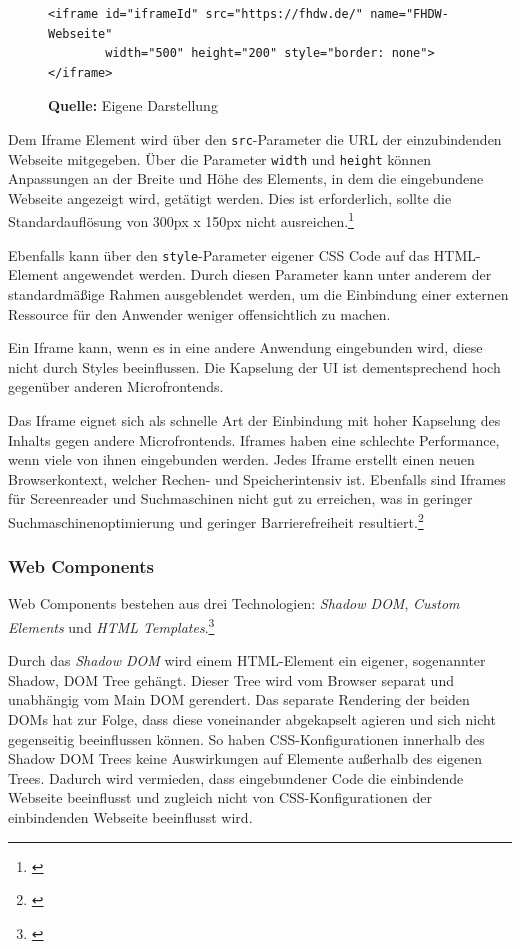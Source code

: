 \begin{figure}[bht]
	\begin{lstlisting}[caption=Exemplarische Einbindung einer Webseite über das Iframe-Element, label=list:iframe]
		<iframe id="iframeId" src="https://fhdw.de/" name="FHDW-Webseite" 
		width="500" height="200" style="border: none"></iframe>
	\end{lstlisting}
	\footnoterule{}
	\footnotesize{\textbf{Quelle:} Eigene Darstellung}
\end{figure}

Dem Iframe Element wird über den \texttt{src}-Parameter die \gls{URL} der einzubindenden Webseite mitgegeben. Über die Parameter \texttt{width} und \texttt{height} können Anpassungen an der Breite und Höhe des Elements, in dem die eingebundene Webseite angezeigt wird, getätigt werden. Dies ist erforderlich, sollte die Standardauflösung von 300px x 150px nicht ausreichen.\footnote{\cite[vgl.][]{MDNWebDocs2021a}}

Ebenfalls kann über den \texttt{style}-Parameter eigener \gls{CSS} Code auf das \gls{HTML}-Element angewendet werden. Durch diesen Parameter kann unter anderem der standardmäßige Rahmen ausgeblendet werden, um die Einbindung einer externen Ressource für den Anwender weniger offensichtlich zu machen.

Ein Iframe kann, wenn es in eine andere Anwendung eingebunden wird, diese nicht durch Styles beeinflussen. Die Kapselung der UI ist dementsprechend hoch gegenüber anderen Microfrontends.

Das Iframe eignet sich als schnelle Art der Einbindung mit hoher Kapselung des Inhalts gegen andere Microfrontends. Iframes haben eine schlechte Performance, wenn viele von ihnen eingebunden werden. Jedes Iframe erstellt einen neuen Browserkontext, welcher Rechen- und Speicherintensiv ist. Ebenfalls sind Iframes für Screenreader und Suchmaschinen nicht gut zu erreichen, was in geringer Suchmaschinenoptimierung und geringer Barrierefreiheit resultiert.\footnote{\cite[vgl.][35]{Geers2020}}

\subsubsection{Web Components}\label{sec:Webcomponents}

Web Components bestehen aus drei Technologien: \textit{Shadow DOM}, \textit{Custom Elements} und \textit{HTML Templates}.\footnote{\cite[vgl.][]{MDNWebDocs2022a}}

Durch das \textit{Shadow \gls{DOM}} wird einem \gls{HTML}-Element ein eigener, sogenannter Shadow, \gls{DOM} Tree gehängt. Dieser Tree wird vom Browser separat und unabhängig vom Main \gls{DOM} gerendert. Das separate Rendering der beiden \gls{DOM}s hat zur Folge, dass diese voneinander abgekapselt agieren und sich nicht gegenseitig beeinflussen können. So haben \gls{CSS}-Konfigurationen innerhalb des Shadow \gls{DOM} Trees keine Auswirkungen auf Elemente außerhalb des eigenen Trees. Dadurch wird vermieden, dass eingebundener Code die einbindende Webseite beeinflusst und zugleich nicht von \gls{CSS}-Konfigurationen der einbindenden Webseite beeinflusst wird.

